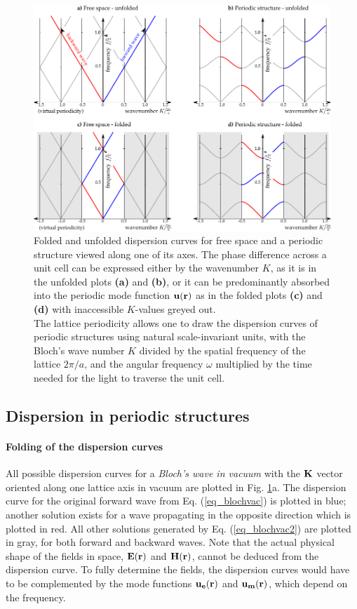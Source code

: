 \begin{figure}[ht] \caption{Folded and unfolded dispersion curves for free space and a periodic structure viewed along one of its axes. The phase difference across a unit cell can be expressed either by the wavenumber $K$, as it is in the unfolded plots \textbf{(a)} and \textbf{(b)}, or it can be predominantly absorbed into the periodic mode function $\mathbf{u}({\mathbf{r}})$  as in the folded plots \textbf{(c)} and \textbf{(d)} with inaccessible $K$-values greyed out. \\
The lattice periodicity allows one to draw the dispersion curves of periodic structures using natural scale-invariant units, with the Bloch's wave number $K$ divided by the spatial frequency of the lattice $2\pi/a$, and the angular frequency $\omega$ multiplied by the time needed for the light to traverse the unit cell.
} \label{fg_phcfolding} \centering 
	\includegraphics[width=\textwidth]{img/PhC_folding_illustration.pdf} 
\end{figure}
\clearpage


\subsection{Dispersion in periodic structures}
\paragraph{Folding of the dispersion curves} %
All possible dispersion curves for a \textit{Bloch's wave in vacuum} with the ${\mathbf{K}}$ vector oriented along one lattice axis in vacuum are plotted in Fig. \ref{fg_phcfolding}a. The dispersion curve for the original forward wave from Eq. (\ref{eq_blochvac}) is plotted in blue; another solution exists for a wave propagating in the opposite direction which is plotted in red. All other solutions generated by Eq. (\ref{eq_blochvac2}) are plotted in gray, for both forward and backward waves. 
Note that the actual physical shape of the fields in space,  $\mathbf{E}({\mathbf{r}})$ and $\mathbf{H}({\mathbf{r}})$, cannot be deduced from the dispersion curve. To fully determine the fields, the dispersion curves would have to be complemented by the mode functions $\mathbf{u_e}({\mathbf{r}})$ and $\mathbf{u_m}({\mathbf{r}})$, which depend on the frequency. 

